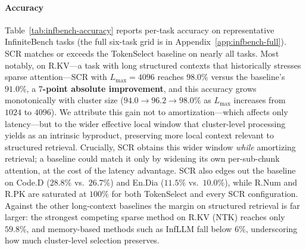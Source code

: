 \documentclass[10pt,conference]{IEEEtran}
\begin{document}
\paragraph{Accuracy}
Table~\ref{tab:infbench-accuracy} reports per-task accuracy on
representative InfiniteBench tasks (the full six-task grid is in
Appendix~\ref{app:infbench-full}). SCR matches or exceeds the
TokenSelect baseline on nearly all tasks. Most notably, on R.KV---a task
with long structured contexts that historically stresses sparse
attention---SCR with $L_{\max} = 4096$ reaches $98.0\%$ versus the
baseline's $91.0\%$, a \textbf{$7$-point absolute improvement}, and
this accuracy grows monotonically with cluster size
($94.0 \to 96.2 \to 98.0\%$ as $L_{\max}$ increases from $1024$ to
$4096$). We attribute this gain not to amortization---which affects only
latency---but to the wider effective local window that cluster-level
processing yields as an intrinsic byproduct, preserving more local
context relevant to structured retrieval. Crucially, SCR obtains this
wider window \emph{while} amortizing retrieval; a baseline could match
it only by widening its own per-sub-chunk attention, at the cost of the
latency advantage. SCR also edges out the
baseline on Code.D ($28.8\%$ vs.\ $26.7\%$) and
En.Dia ($11.5\%$ vs.\ $10.0\%$), while
R.Num and R.PK are saturated at
$100\%$ for both TokenSelect and every SCR configuration. Against the
other long-context baselines the margin on structured retrieval is far
larger: the strongest competing sparse method on R.KV
(NTK) reaches only $59.8\%$, and memory-based methods such as InfLLM
fall below $6\%$, underscoring how much cluster-level selection
preserves.
\end{document}
